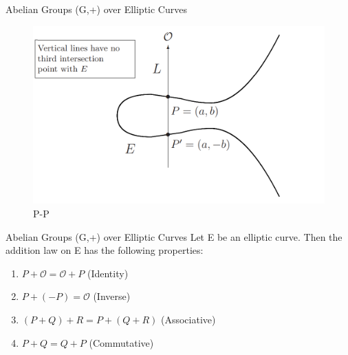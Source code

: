 \documentclass{beamer}
\begin{document}
\begin{frame}{Abelian Groups (G,+) over Elliptic Curves}
\begin{figure}

		\centering
		\includegraphics[width=1\linewidth]{P-P}
		\caption{P-P}\label{fig:p-p}


\end{figure}
\end{frame}
\begin{frame}{Abelian Groups (G,+) over Elliptic Curves}
	Let E be an elliptic curve. Then the addition law on E has the following properties:
	\begin{enumerate}[1.]
		\item $P + \mathcal{O} = \mathcal{O} + P$ (Identity)
		\item $P + (-P) = \mathcal{O}$ (Inverse)
		\item $(P + Q) + R = P + (Q + R) $ (Associative)
		\item $P + Q = Q + P$ (Commutative)
	\end{enumerate}

\end{frame}
\end{document}
